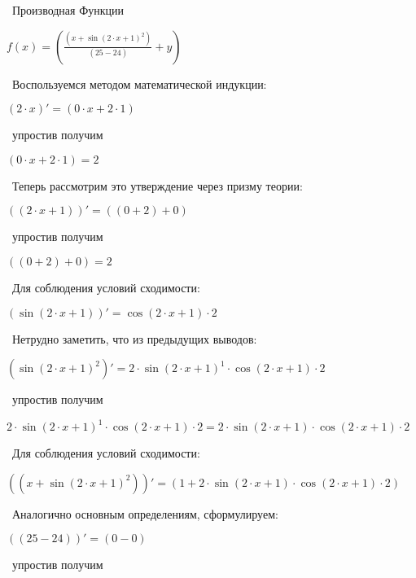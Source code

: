 \documentclass[a4paper,14pt]{extarticle}
\begin{document}
\ Производная Функции \
\begin{center}$f(x) = (\frac{(x+\sin  (2\cdot x+1)^{2})}{(25-24)}+y)$\end{center}\ 
Воспользуемся методом математической индукции: \\ 

\begin{center}$(2\cdot x)' = (0\cdot x+2\cdot 1)$\end{center}\ 
упростив получим 

\begin{center}$(0\cdot x+2\cdot 1) = 2$\end{center}\ 
Теперь рассмотрим это утверждение через призму теории: \\ 

\begin{center}$((2\cdot x+1))' = ((0+2)+0)$\end{center}\ 
упростив получим 

\begin{center}$((0+2)+0) = 2$\end{center}\ 
Для соблюдения условий сходимости: \\ 

\begin{center}$(\sin  (2\cdot x+1))' = \cos  (2\cdot x+1)\cdot 2$\end{center}\ 
Нетрудно заметить, что из предыдущих выводов: \\ 

\begin{center}$(\sin  (2\cdot x+1)^{2})' = 2\cdot \sin  (2\cdot x+1)^{1}\cdot \cos  (2\cdot x+1)\cdot 2$\end{center}\ 
упростив получим 

\begin{center}$2\cdot \sin  (2\cdot x+1)^{1}\cdot \cos  (2\cdot x+1)\cdot 2 = 2\cdot \sin  (2\cdot x+1)\cdot \cos  (2\cdot x+1)\cdot 2$\end{center}\ 
Для соблюдения условий сходимости: \\ 

\begin{center}$((x+\sin  (2\cdot x+1)^{2}))' = (1+2\cdot \sin  (2\cdot x+1)\cdot \cos  (2\cdot x+1)\cdot 2)$\end{center}\ 
Аналогично основным определениям, сформулируем: \\ 

\begin{center}$((25-24))' = (0-0)$\end{center}\ 
упростив получим 
\end{document}
